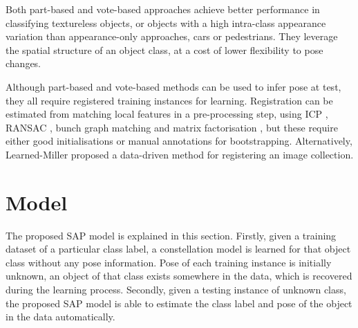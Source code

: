 Both part-based and vote-based approaches achieve better performance in classifying textureless objects, or objects with a high intra-class appearance variation than appearance-only approaches, \eg cars or pedestrians. They leverage the spatial structure of an object class, at a cost of lower flexibility to pose changes.     





Although part-based and vote-based methods can be used to infer pose at test, they all require registered training instances for learning.  
Registration can be estimated from matching local features in a pre-processing step, using ICP \cite{Pham2011}, RANSAC \cite{Moreels2007}, bunch graph matching \cite{Wiskott1997} and matrix factorisation \cite{Arie-Nachimson2009}, but these require either good initialisations or manual annotations for bootstrapping. Alternatively, Learned-Miller \cite{Learned-Miller2006} proposed a data-driven method for registering an image collection.  

\section{Model}
\label{sec/reg/framework}

The proposed SAP model is explained in this section. 
Firstly, given a training dataset of a particular class label, a constellation model is learned for that object class without any pose information. Pose of each training instance is initially unknown, \ie an object of that class exists somewhere in the data, which is recovered during the learning process.
Secondly, given a testing instance of unknown class, the proposed SAP model is able to estimate the class label and pose of the object in the data automatically. 

